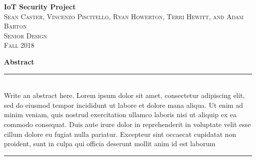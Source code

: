 \documentclass[a4paper,titlepage]{article}
\begin{document}
\begin{titlepage}
\vspace*{\fill}

\newcommand{\HRule}{\rule{\linewidth}{0.5mm}} %

\center %


{ \huge \bfseries IoT Security Project}\\[0.4cm] %


\textsc{\LARGE Sean Caster, Vincenzo Piscitello, Ryan Howerton, Terri Hewitt, and Adam Barton}\\[0.5cm] %
\textsc{\Large Senior Design}\\[0.5cm] %
\textsc{\large Fall 2018}\\[2.5cm] %


\begin{minipage}{.8\textwidth}  %
\textbf{\large Abstract} \\
\HRule \\[0.4cm]
Write an abstract here. Lorem ipsum dolor sit amet, consectetur adipiscing elit, sed do eiusmod tempor incididunt ut labore et dolore mana aliqua. Ut enim ad minim veniam, quis nostrud exercitation ullamco laboris nisi ut aliquip ex ea commodo consequat. Duis aute irure dolor in reprehenderit in voluptate velit esse cillum dolore eu fugiat nulla pariatur. Excepteur sint occaecat cupidatat non proident, sunt in culpa qui officia deserunt mollit anim id est laborum
\\[0.4cm]
\HRule \\[1.5cm]
\end{minipage}



\end{titlepage}
\end{document}
